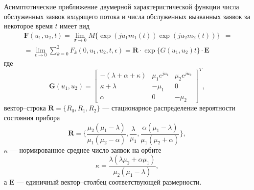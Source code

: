 \begin{theorem}
	Асимптотические приближение двумерной характеристической функции числа обслуженных заявок входящего потока и числа обслуженных вызванных заявок за некоторое время $t$ имеет вид
	\begin{equation*} \label{theorem_twodim}
		\begin{split}
			\boldsymbol{F}(u_{1},u_{2},t) =  \lim_{\sigma \xrightarrow{} 0} M\{\exp(ju_{1}m_{1}(t))\exp(ju_{2}m_{2}(t))\} &= 
			\\
			= \lim_{\epsilon \xrightarrow{} 0} \sum_{k=0}^{2}F_{k}(0,u_{1},u_{2},t,\epsilon) = \boldsymbol{R} \cdot \exp\{G(u_{1},u_{2})t\} \cdot \boldsymbol{E}
		\end{split}
	\end{equation*}
	где 
	\begin{equation*}
		\boldsymbol{G}(u_{1},u_{2})=\begin{bmatrix}
			-(\lambda + \alpha + \kappa) & \mu_{1}e^{ju_{1}} &  \mu_{2}e^{ju_{2}}\\
			\kappa+\lambda & -\mu_{1} & 0\\
			\alpha & 	0 &	-\mu_{2}
		\end{bmatrix}^{T},
	\end{equation*}
	вектор--строка $\boldsymbol{R}=\{R_{0},R_{1},R_{2}\}$ --- стационарное распределение вероятности состояния прибора
	\begin{equation*}
		\boldsymbol{R}=\{\frac{\mu_{2}(\mu_{1} - \lambda)}{\mu_{1}(\mu_{2} - \alpha)},\frac{\lambda}{\mu_{1}},\frac{\alpha(\mu_{1} - \lambda)}{\mu_{1}(\mu_{2} + \alpha)}\},
	\end{equation*}
	$\kappa$ --- нормированное среднее число заявок на орбите
	\begin{equation*}
		\kappa = \frac{\lambda(\lambda \mu_{2} + \alpha \mu_{1})}{\mu_{2}(\mu_{1} - \lambda)},
	\end{equation*}
	а $\boldsymbol{E}$ --- единичный вектор--столбец соответствующей размерности.
\end{theorem}
